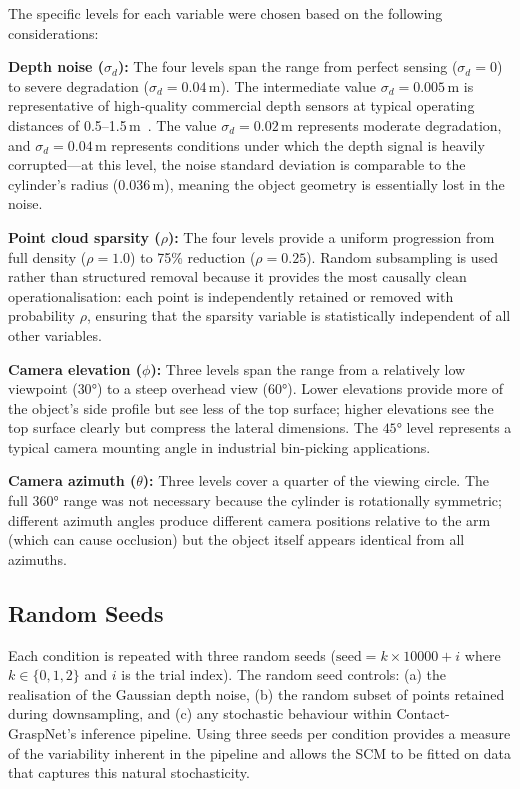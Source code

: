 \documentclass[11pt,a4paper]{report}
\begin{document}
The specific levels for each variable were chosen based on the following considerations:

\textbf{Depth noise ($\sigma_d$):} The four levels span the range from perfect sensing ($\sigma_d = 0$) to severe degradation ($\sigma_d = 0.04$\,m). The intermediate value $\sigma_d = 0.005$\,m is representative of high-quality commercial depth sensors at typical operating distances of 0.5--1.5\,m~\cite{khoshelham2011accuracy}. The value $\sigma_d = 0.02$\,m represents moderate degradation, and $\sigma_d = 0.04$\,m represents conditions under which the depth signal is heavily corrupted---at this level, the noise standard deviation is comparable to the cylinder's radius (0.036\,m), meaning the object geometry is essentially lost in the noise.

\textbf{Point cloud sparsity ($\rho$):} The four levels provide a uniform progression from full density ($\rho = 1.0$) to 75\% reduction ($\rho = 0.25$). Random subsampling is used rather than structured removal because it provides the most causally clean operationalisation: each point is independently retained or removed with probability $\rho$, ensuring that the sparsity variable is statistically independent of all other variables.

\textbf{Camera elevation ($\phi$):} Three levels span the range from a relatively low viewpoint ($30°$) to a steep overhead view ($60°$). Lower elevations provide more of the object's side profile but see less of the top surface; higher elevations see the top surface clearly but compress the lateral dimensions. The $45°$ level represents a typical camera mounting angle in industrial bin-picking applications.

\textbf{Camera azimuth ($\theta$):} Three levels cover a quarter of the viewing circle. The full $360°$ range was not necessary because the cylinder is rotationally symmetric; different azimuth angles produce different camera positions relative to the arm (which can cause occlusion) but the object itself appears identical from all azimuths.

\subsection{Random Seeds}

Each condition is repeated with three random seeds ($\text{seed} = k \times 10000 + i$ where $k \in \{0, 1, 2\}$ and $i$ is the trial index). The random seed controls: (a) the realisation of the Gaussian depth noise, (b) the random subset of points retained during downsampling, and (c) any stochastic behaviour within Contact-GraspNet's inference pipeline. Using three seeds per condition provides a measure of the variability inherent in the pipeline and allows the SCM to be fitted on data that captures this natural stochasticity.
\end{document}
